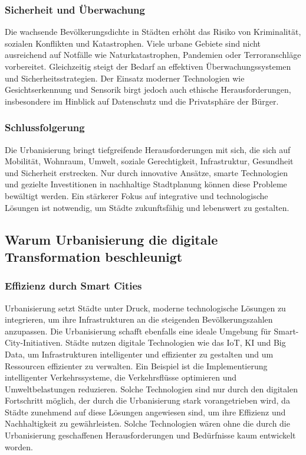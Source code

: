 \documentclass[conference,compsoc,final,a4paper, onecolumn, 11pt]{IEEEtran}
\begin{document}
\subsubsection{Sicherheit und Überwachung}
Die wachsende Bevölkerungsdichte in Städten erhöht das Risiko von Kriminalität, sozialen Konflikten und Katastrophen. 
Viele urbane Gebiete sind nicht ausreichend auf Notfälle wie Naturkatastrophen, Pandemien oder Terroranschläge vorbereitet. 
Gleichzeitig steigt der Bedarf an effektiven Überwachungssystemen und Sicherheitsstrategien. 
Der Einsatz moderner Technologien wie Gesichtserkennung und Sensorik birgt jedoch auch ethische Herausforderungen, insbesondere im Hinblick auf Datenschutz und die Privatsphäre der Bürger. \autocite{mckinsey_global_institute_smart_2021}


\subsubsection{Schlussfolgerung}
Die Urbanisierung bringt tiefgreifende Herausforderungen mit sich, die sich auf Mobilität, Wohnraum, Umwelt, soziale Gerechtigkeit, Infrastruktur, Gesundheit und Sicherheit erstrecken. 
Nur durch innovative Ansätze, smarte Technologien und gezielte Investitionen in nachhaltige Stadtplanung können diese Probleme bewältigt werden. 
Ein stärkerer Fokus auf integrative und technologische Lösungen ist notwendig, um Städte zukunftsfähig und lebenswert zu gestalten.


\subsection{Warum Urbanisierung die digitale Transformation beschleunigt}

\subsubsection{Effizienz durch Smart Cities}
Urbanisierung setzt Städte unter Druck, moderne technologische Lösungen zu integrieren, um ihre Infrastrukturen an die steigenden Bevölkerungszahlen anzupassen.
Die Urbanisierung schafft ebenfalls eine ideale Umgebung für Smart-City-Initiativen. 
Städte nutzen digitale Technologien wie das \ac{IoT}, \ac{KI} und Big Data, um Infrastrukturen intelligenter und effizienter zu gestalten und um Ressourcen effizienter zu verwalten.
Ein Beispiel ist die Implementierung intelligenter Verkehrssysteme, die Verkehrsflüsse optimieren und Umweltbelastungen reduzieren. 
Solche Technologien sind nur durch den digitalen Fortschritt möglich, der durch die Urbanisierung stark vorangetrieben wird, da Städte zunehmend auf diese Lösungen angewiesen sind, um ihre Effizienz und Nachhaltigkeit zu gewährleisten.
Solche Technologien wären ohne die durch die Urbanisierung geschaffenen Herausforderungen und Bedürfnisse kaum entwickelt worden. \autocite{mckinsey_global_institute_smart_2021}
\end{document}
